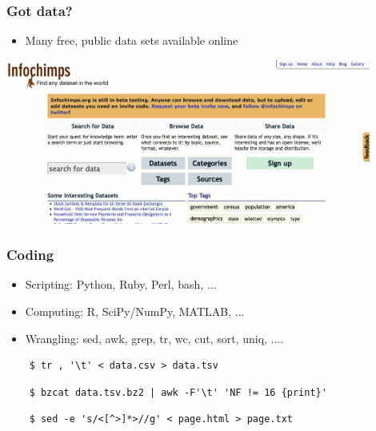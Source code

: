 \documentclass[xcolor=dvipsnames, 9pt]{beamer}
\begin{document}
\begin{frame}
  \frametitle{Got data?}

  \begin{itemize}
    \item Many free, public data sets available online
  \end{itemize}

    \begin{center}
      \includegraphics[width=0.9\textwidth]{infochimps.png}
    \end{center}

\end{frame}

\begin{frame}[fragile]
  \frametitle{Coding}

  \begin{itemize}
    \item Scripting: Python, Ruby, Perl, bash, ...
    \item Computing: R, SciPy/NumPy, MATLAB, ...
    \item Wrangling: sed, awk, grep, tr, wc, cut, sort, uniq, ....
  \end{itemize}

  \pause
  \begin{verbatim}
    $ tr , '\t' < data.csv > data.tsv
  \end{verbatim}

  \pause
  \begin{verbatim}
    $ bzcat data.tsv.bz2 | awk -F'\t' 'NF != 16 {print}'
  \end{verbatim}

  \pause
  \begin{verbatim}
    $ sed -e 's/<[^>]*>//g' < page.html > page.txt
  \end{verbatim}


\end{frame}

\end{document}
